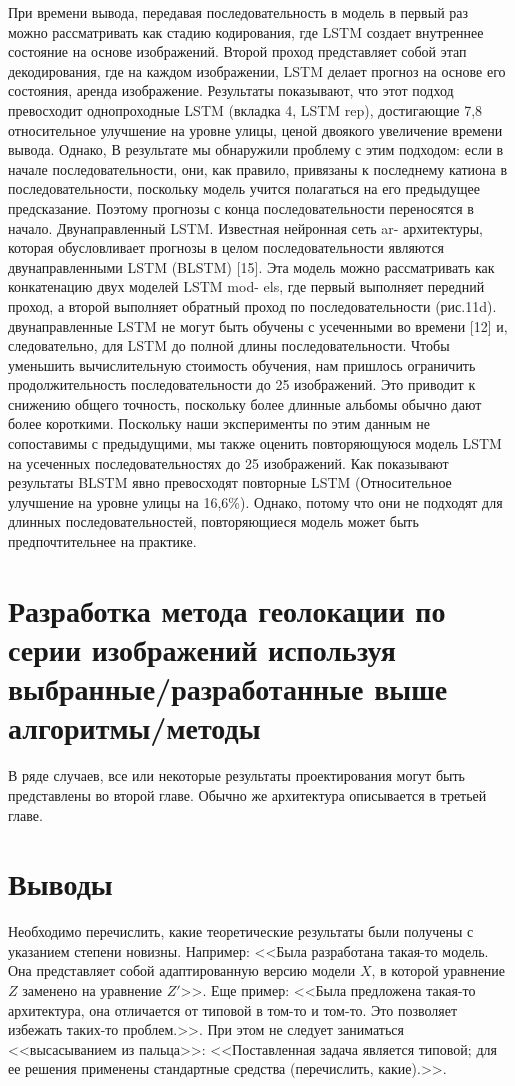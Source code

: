 При времени вывода, передавая последовательность в модель
в первый раз можно рассматривать как стадию кодирования, где
LSTM создает внутреннее состояние на основе изображений.
Второй проход представляет собой этап декодирования, где на каждом изображении,
LSTM делает прогноз на основе его состояния,
аренда изображение. Результаты показывают, что этот подход превосходит
однопроходные LSTM (вкладка 4, LSTM rep), достигающие 7,8%
относительное улучшение на уровне улицы, ценой двоякого
увеличение времени вывода. Однако,
В результате мы обнаружили проблему с этим подходом:
если в начале
последовательности, они, как правило, привязаны к последнему
катиона в последовательности, поскольку модель учится полагаться на
его предыдущее предсказание. Поэтому прогнозы с конца
последовательности переносятся в начало.
Двунаправленный LSTM. Известная нейронная сеть ar-
архитектуры, которая обусловливает прогнозы в целом
последовательности являются двунаправленными LSTM (BLSTM) [15]. Эта
модель можно рассматривать как конкатенацию двух моделей LSTM mod-
els, где первый выполняет передний проход, а второй выполняет обратный проход по последовательности (рис.11d). двунаправленные LSTM не могут быть обучены с усеченными во времени [12] и, следовательно, для
LSTM до полной длины последовательности. Чтобы уменьшить
вычислительную стоимость обучения, нам пришлось ограничить продолжительность
последовательности до 25 изображений. Это приводит к снижению общего
точность, поскольку более длинные альбомы обычно дают
более короткими. Поскольку наши эксперименты по этим данным
не сопоставимы с предыдущими, мы также
оценить повторяющуюся модель LSTM на усеченных последовательностях
до 25 изображений. Как показывают результаты BLSTM явно превосходят повторные LSTM
(Относительное улучшение на уровне улицы на 16,6\%). Однако,
потому что они не подходят для длинных последовательностей, повторяющиеся
модель может быть предпочтительнее на практике.


\section{Разработка метода геолокации по серии изображений используя выбранные/разработанные выше алгоритмы/методы}

В ряде случаев, все или некоторые результаты проектирования могут быть представлены во второй главе. Обычно же архитектура описывается в третьей главе.

\section{Выводы}

Необходимо перечислить, какие теоретические результаты были получены с 
указанием степени новизны. Например: <<Была разработана такая-то модель. Она 
представляет собой адаптированную версию модели $X$, в которой уравнение $Z$ 
заменено на уравнение $Z'$>>. Еще пример: <<Была предложена такая-то 
архитектура, она отличается от типовой в том-то и том-то. Это позволяет 
избежать таких-то проблем.>>. При этом не следует заниматься <<высасыванием из 
пальца>>: <<Поставленная задача является типовой; для ее решения применены 
стандартные средства (перечислить, какие).>>.
